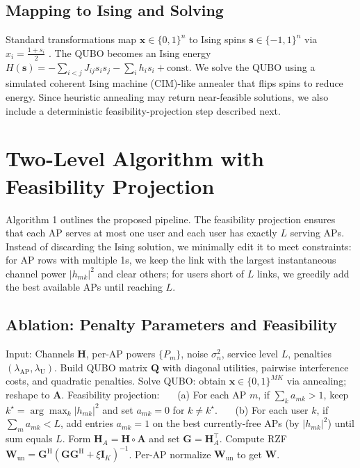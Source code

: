 {\subsection{Mapping to Ising and Solving}
Standard transformations map $\mathbf{x}\in\{0,1\}^n$ to Ising spins $\mathbf{s}\in\{-1,1\}^n$ via $x_i=\frac{1+s_i}{2}$ \cite{lucas2014ising,glover2018tutorial}. The QUBO becomes an Ising energy $H(\mathbf{s})=-\sum_{i<j}J_{ij}s_is_j-\sum_i h_i s_i+\text{const}$. We solve the QUBO using a simulated coherent Ising machine (CIM)-like annealer that flips spins to reduce energy. Since heuristic annealing may return near-feasible solutions, we also include a deterministic feasibility-projection step described next.

\section{Two-Level Algorithm with Feasibility Projection}
Algorithm 1 outlines the proposed pipeline. The feasibility projection ensures that each AP serves at most one user and each user has exactly $L$ serving APs. Instead of discarding the Ising solution, we minimally edit it to meet constraints: for AP rows with multiple 1s, we keep the link with the largest instantaneous channel power $|h_{mk}|^2$ and clear others; for users short of $L$ links, we greedily add the best available APs until reaching $L$.


\begin{algorithm}[htbp]
\subsection{Ablation: Penalty Parameters and Feasibility}
\caption{Two-Level QUBO-RZF with Feasibility Projection}
\begin{algorithmic}[1]
\State Input: Channels $\mathbf{H}$, per-AP powers $\{P_m\}$, noise $\sigma_n^2$, service level $L$, penalties $(\lambda_{\text{AP}},\lambda_{\text{U}})$.
\State Build QUBO matrix $\mathbf{Q}$ with diagonal utilities, pairwise interference costs, and quadratic penalties.
\State Solve QUBO: obtain $\mathbf{x}\in\{0,1\}^{MK}$ via annealing; reshape to $\mathbf{A}$.
\State Feasibility projection:
\State ~~~(a) For each AP $m$, if $\sum_k a_{mk}>1$, keep $k^\star=\arg\max_k |h_{mk}|^2$ and set $a_{mk}=0$ for $k\neq k^\star$.
\State ~~~(b) For each user $k$, if $\sum_m a_{mk}<L$, add entries $a_{mk}=1$ on the best currently-free APs (by $|h_{mk}|^2$) until sum equals $L$.
\State Form $\mathbf{H}_A=\mathbf{H}\circ \mathbf{A}$ and set $\mathbf{G}=\mathbf{H}_A^\top$.
\State Compute RZF $\mathbf{W}_{\mathrm{un}}=\mathbf{G}^\mathrm{H}(\mathbf{G}\mathbf{G}^\mathrm{H}+\xi \mathbf{I}_K)^{-1}$.
\State Per-AP normalize $\mathbf{W}_{\mathrm{un}}$ to get $\mathbf{W}$.


\end{algorithmic}
\end{algorithm}}

